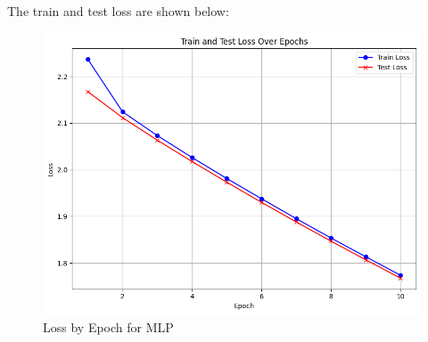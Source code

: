 \documentclass[11pt,a4paper]{article}
\begin{document}
The train and test loss are shown below:

\begin{figure}[H]
    \centering
    \includegraphics[width=0.5\linewidth]{MLPTrainTestLoss.png}
    \caption{Loss by Epoch for MLP}
    \label{fig:enter-label}
\end{figure}
\end{document}
